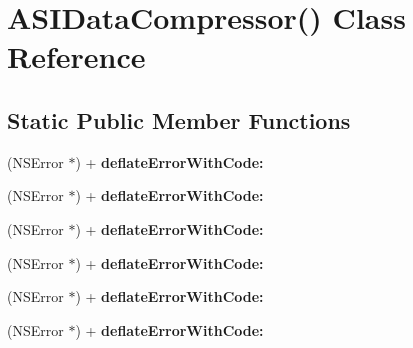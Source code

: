 \hypertarget{interface_a_s_i_data_compressor_07_08}{
\section{\-A\-S\-I\-Data\-Compressor() \-Class \-Reference}
\label{interface_a_s_i_data_compressor_07_08}
}
\subsection*{\-Static \-Public \-Member \-Functions}
\begin{DoxyCompactItemize}
\item 
\hypertarget{interface_a_s_i_data_compressor_07_08_aa5574c3985866bdee75f28923a06c4fd}{
(\-N\-S\-Error $\ast$) + {\bfseries deflate\-Error\-With\-Code\-:}}
\label{interface_a_s_i_data_compressor_07_08_aa5574c3985866bdee75f28923a06c4fd}

\item 
\hypertarget{interface_a_s_i_data_compressor_07_08_aa5574c3985866bdee75f28923a06c4fd}{
(\-N\-S\-Error $\ast$) + {\bfseries deflate\-Error\-With\-Code\-:}}
\label{interface_a_s_i_data_compressor_07_08_aa5574c3985866bdee75f28923a06c4fd}

\item 
\hypertarget{interface_a_s_i_data_compressor_07_08_aa5574c3985866bdee75f28923a06c4fd}{
(\-N\-S\-Error $\ast$) + {\bfseries deflate\-Error\-With\-Code\-:}}
\label{interface_a_s_i_data_compressor_07_08_aa5574c3985866bdee75f28923a06c4fd}

\item 
\hypertarget{interface_a_s_i_data_compressor_07_08_aa5574c3985866bdee75f28923a06c4fd}{
(\-N\-S\-Error $\ast$) + {\bfseries deflate\-Error\-With\-Code\-:}}
\label{interface_a_s_i_data_compressor_07_08_aa5574c3985866bdee75f28923a06c4fd}

\item 
\hypertarget{interface_a_s_i_data_compressor_07_08_aa5574c3985866bdee75f28923a06c4fd}{
(\-N\-S\-Error $\ast$) + {\bfseries deflate\-Error\-With\-Code\-:}}
\label{interface_a_s_i_data_compressor_07_08_aa5574c3985866bdee75f28923a06c4fd}

\item 
\hypertarget{interface_a_s_i_data_compressor_07_08_aa5574c3985866bdee75f28923a06c4fd}{
(\-N\-S\-Error $\ast$) + {\bfseries deflate\-Error\-With\-Code\-:}}
\label{interface_a_s_i_data_compressor_07_08_aa5574c3985866bdee75f28923a06c4fd}


\end{DoxyCompactItemize}
